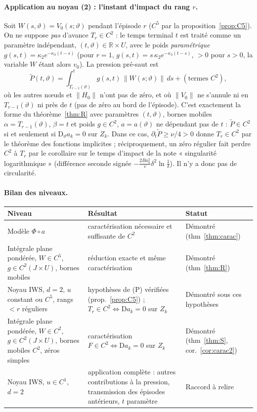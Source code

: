 \documentclass[11pt,a4paper]{article}
\theoremstyle{remark}
\newcommand{\R}{\mathbb R}
\newcommand{\vth}{\vartheta}
\newcommand{\D}{\mathrm D}
\begin{document}
\paragraph{Application au noyau (2) : l'instant d'impact du rang $r$.} Soit $W(s,\vth)=V_0(s;\vth)$ pendant l'épisode $r$ ($C^5$ par la proposition~\ref{prop:C5}). On ne suppose \emph{pas} d'avance $T_r\in C^2$ : le temps terminal $t$ est traité comme un paramètre indépendant, $(t,\vth)\in\R\times U$, avec le poids \emph{paramétrique} $g(s,t)=\kappa_2e^{-\kappa_3(t-s)}$ (pour $r=1$, $g(s,t)=s\,\kappa_2e^{-\kappa_3(t-s)}$, $>0$ pour $s>0$, la variable $W$ étant alors $v_0$). La pression pré-saut est
\[
\tilde P(t,\vth)=\int_{T_{r-1}(\vth)}^{t}g(s,t)\,\lVert W(s;\vth)\rVert\,ds+(\text{termes }C^2),
\]
où les autres n\oe uds et $\lVert H_0\rVert$ n'ont pas de zéro, et où $\lVert V_0\rVert$ ne s'annule ni en $T_{r-1}(\vth)$ ni près de $t$ (pas de zéro au bord de l'épisode). C'est exactement la forme du théorème~\ref{thm:R} avec paramètres $(t,\vth)$, bornes mobiles $\alpha=T_{r-1}(\vth)$, $\beta=t$ et poids $g\in C^2$, $a=a(\vth)$ ne dépendant pas de $t$ : $\tilde P\in C^2$ si et seulement si $\D_\vth a_k=0$ sur $Z_k$. Dans ce cas, $\partial_t\tilde P\ge\nu/4>0$ donne $T_r\in C^2$ par le théorème des fonctions implicites ; réciproquement, un zéro régulier fait perdre $C^2$ à $T_r$ par le corollaire sur le temps d'impact de la note « singularité logarithmique » (différence seconde signée $-\frac{2Ba_h^2}{v}\delta^2\ln\frac1\delta$). Il n'y a donc pas de circularité.

\paragraph{Bilan des niveaux.}
\begin{center}\small
\begin{tabular}{p{4.4cm}p{6cm}p{3.4cm}}
\toprule
Niveau & Résultat & Statut\\\midrule
Modèle $\Phi\circ a$ & caractérisation nécessaire et suffisante de $C^2$ & Démontré (thm~\ref{thm:carac})\\
Intégrale plane pondérée, $W\in C^5$, $g\in C^2(J\times U)$, bornes mobiles & réduction exacte et même caractérisation & Démontré (thm~\ref{thm:R})\\
Noyau IWS, $d=2$, $u$ constant ou $C^5$, rangs $<r$ réguliers & hypothèses de (P) vérifiées (prop.~\ref{prop:C5}) ; $T_r\in C^2\iff\D a_k=0$ sur $Z_k$ & Démontré sous ces hypothèses\\
Intégrale plane pondérée, $W\in C^2$, $g\in C^2(J\times U)$, bornes mobiles $C^2$, zéros simples & caractérisation $F\in C^2\iff\D a_k=0$ sur $Z_k$ & Démontré (thm~\ref{thm:S}, cor.~\ref{cor:carac2})\\
Noyau IWS, $u\in C^1$, $d=2$ & application complète : autres contributions à la pression, transmission des épisodes antérieurs, $t$ paramètre & Raccord à relire\\\bottomrule
\end{tabular}
\end{center}
\end{document}
